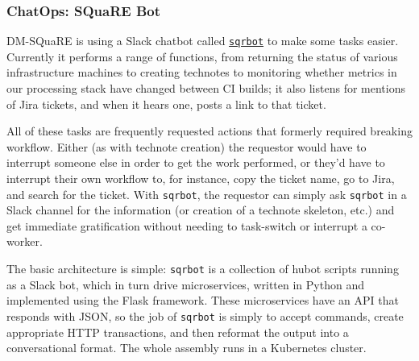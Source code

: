 \subsubsection{ChatOps: SQuaRE Bot}
\label{sec:chatops}

DM-SQuaRE is using a Slack chatbot called \href{https://github.com/lsst-sqre/sqrbot}{\texttt{sqrbot}} to make some tasks
easier. Currently it performs a range of functions, from returning the
status of various infrastructure machines to creating technotes to
monitoring whether metrics in our processing stack have changed between
CI builds; it also listens for mentions of Jira tickets, and when it
hears one, posts a link to that ticket.

All of these tasks are frequently requested actions that formerly
required breaking workflow.  Either (as with technote creation) the
requestor would have to interrupt someone else in order to get the work
performed, or they'd have to interrupt their own workflow to, for
instance, copy the ticket name, go to Jira, and search for the ticket.
With \texttt{sqrbot}, the requestor can simply ask \texttt{sqrbot} in a Slack channel for
the information (or creation of a technote skeleton, etc.) and get
immediate gratification without needing to task-switch or interrupt
a co-worker.

The basic architecture is simple: \texttt{sqrbot} is a collection of hubot
scripts running as a Slack bot, which in turn drive microservices,
written in Python and implemented using the Flask framework.  These
microservices have an API that responds with JSON, so the job of \texttt{sqrbot}
is simply to accept commands, create appropriate HTTP transactions, and
then reformat the output into a conversational format.  The whole
assembly runs in a Kubernetes cluster.
